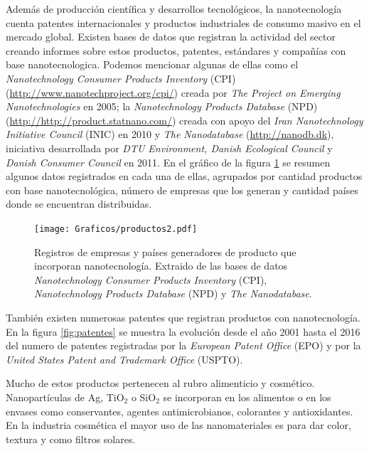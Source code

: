 	 Además de producción científica y desarrollos tecnológicos, la nanotecnología cuenta patentes internacionales y productos industriales de consumo masivo en el mercado global. Existen bases de datos que registran la actividad del sector creando informes sobre estos productos, patentes, estándares y compañías con base nanotecnologica. Podemos mencionar algunas de ellas como el \textit{Nanotechnology Consumer Products Inventory} (CPI) (\url{http://www.nanotechproject.org/cpi/}) creada por \textit{The Project on Emerging Nanotechnologies} en 2005\cite{Vance2015}; la \textit{Nanotechnology Products Database} (NPD) (\url{http://http://product.statnano.com/}) creada con apoyo del \textit{Iran Nanotechnology Initiative Council} (INIC) en 2010 y \textit{The Nanodatabase} (\url{http://nanodb.dk}), iniciativa desarrollada por \textit{DTU Environment, Danish Ecological Council} y \textit{Danish Consumer Council} en 2011. En el gráfico de la figura \ref{fig:productos} se resumen algunos datos registrados en cada una de ellas, agrupados por cantidad productos con base nanotecnológica, número de empresas que los generan y cantidad países donde se encuentran distribuidas.

		\begin{figure}[ht!]
 			\begin{center}
 			\texttt{[image: Graficos/productos2.pdf]}
 			\caption[Cantidad de productos, compañías y origen con base nanotecnologica]{Registros de empresas y países generadores de producto que incorporan nanotecnología. Extraido de las bases de datos \textit{Nanotechnology Consumer Products Inventory} (CPI), \textit{Nanotechnology Products Database} (NPD) y \textit{The Nanodatabase}.}
 			\label{fig:productos}
 		    \end{center}
 		    \end{figure}

 	 También existen numerosas patentes que registran productos con nanotecnología. En la figura \ref{fig:patentes} se muestra la evolución desde el año 2001 hasta el 2016 del numero de patentes registradas por la \textit{European Patent Office} (EPO) y por la \textit{United States Patent and Trademark Office} (USPTO).

     Mucho de estos productos pertenecen al rubro alimenticio y cosmético. Nanopartículas de Ag, TiO$_2$ o SiO$_2$ se incorporan en los alimentos o en los envases como conservantes, agentes antimicrobianos, colorantes y antioxidantes. En la industria cosmética el mayor uso de las nanomateriales es para dar color, textura y como filtros solares.
 	
